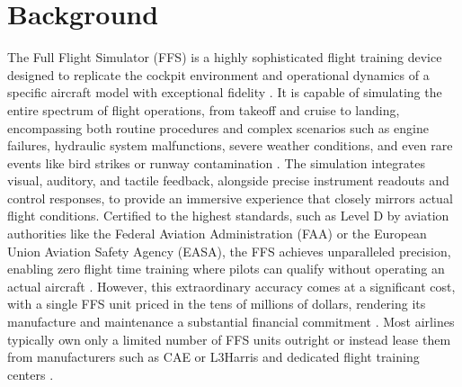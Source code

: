 \documentclass[opre,sglanonrev]{informs4}
\begin{document}



\maketitle


\section{Background}
The Full Flight Simulator (FFS) is a highly sophisticated flight training device designed to replicate the cockpit environment and operational dynamics of a specific aircraft model with exceptional fidelity \citep{ICAO2015}. 
It is capable of simulating the entire spectrum of flight operations, from takeoff and cruise to landing, encompassing both routine procedures and complex scenarios such as engine failures, hydraulic system malfunctions, severe weather conditions, and even rare events like bird strikes or runway contamination \citep{Advancements2024}. The simulation integrates visual, auditory, and tactile feedback, alongside precise instrument readouts and control responses, to provide an immersive experience that closely mirrors actual flight conditions. Certified to the highest standards, such as Level D by aviation authorities like the Federal Aviation Administration (FAA) or the European Union Aviation Safety Agency (EASA), the FFS achieves unparalleled precision, enabling zero flight time training where pilots can qualify without operating an actual aircraft \citep{FAA1995,EASA2020}. However, this extraordinary accuracy comes at a significant cost, with a single FFS unit priced in the tens of millions of dollars, rendering its manufacture and maintenance a substantial financial commitment \citep{CAE7000XR}. Most airlines typically own only a limited number of FFS units outright or instead lease them from manufacturers such as CAE or L3Harris and dedicated flight training centers \citep{IBAAero2023}.
\end{document}
